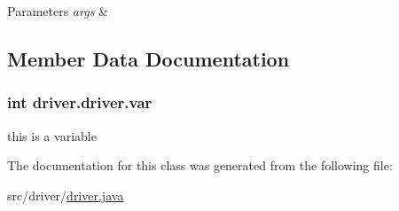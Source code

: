 \begin{DoxyParams}{Parameters}
{\em args} & \\
\hline
\end{DoxyParams}


\subsection{Member Data Documentation}
\subsubsection[{\texorpdfstring{var}{var}}]{\setlength{\rightskip}{0pt plus 5cm}int driver.\+driver.\+var}\hypertarget{classdriver_1_1driver_a171341186cc3c3a33ce7f44a938d9bcd}{}\label{classdriver_1_1driver_a171341186cc3c3a33ce7f44a938d9bcd}
this is a variable 

The documentation for this class was generated from the following file\+:\begin{DoxyCompactItemize}
\item 
src/driver/\hyperlink{driver_8java}{driver.\+java}\end{DoxyCompactItemize}
